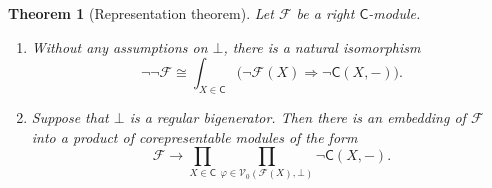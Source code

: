 \documentclass[11pt,onecolumn]{article}
\newcommand{\cV}{\mathscr{V}}
\newcommand{\cC}{\mathsf{C}}
\theoremstyle{plain}
\newtheorem{theorem}{Theorem}[subsection]
\theoremstyle{remark}
\theoremstyle{definition}
\begin{document}
\begin{theorem}[Representation theorem]
	\label{representation}
	Let $\mathcal{F}$ be a right $\cC$-module.
	\begin{enumerate}
		\item\label{item:representation}
			Without any assumptions on $\bot$, there is a natural isomorphism
			\begin{equation}
				\label{eq:representation}
				\neg\neg \mathcal{F}
				\cong
				\int_{X \in \cC} \bigl(\neg \mathcal{F}(X) \Rightarrow \neg \cC(X,-)\bigr).
			\end{equation}

		\item Suppose that $\bot$ is a regular bigenerator.
			Then there is an embedding of $\mathcal{F}$ into a product of corepresentable modules of the form
			\begin{equation}
				\mathcal{F} \longrightarrow \prod_{X \in \cC} \prod_{\varphi \in \cV_0(\mathcal{F}(X),\bot)} \neg \cC(X,-).
			\end{equation}
	\end{enumerate}
\end{theorem}
\end{document}
